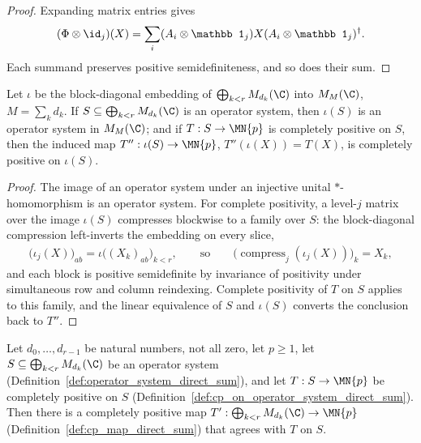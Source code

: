 \begin{proof}\leanok
    Expanding matrix entries gives
    \begin{align}
        (\Phi\otimes\id_j)(X)
        =\sum_i(A_i\otimes\mathbb1_j)X
          (A_i\otimes\mathbb1_j)^\dagger.
    \end{align}
    Each summand preserves positive semidefiniteness, and so does their sum.
\end{proof}

\begin{theorem}
    \label{thm:direct_sum_embedding_transport}
    \leanok
    Let $\iota$ be the block-diagonal embedding of
    $\bigoplus_{k<r}M_{d_k}(\C)$ into $M_M(\C)$, $M=\sum_kd_k$. If
    $S\subseteq\bigoplus_{k<r}M_{d_k}(\C)$ is an operator system, then
    $\iota(S)$ is an operator system in $M_M(\C)$; and if
    $T:S\to\MN{p}$ is completely positive on $S$, then the induced map
    $T'':\iota(S)\to\MN{p}$, $T''(\iota(X))=T(X)$, is completely positive
    on $\iota(S)$.
\end{theorem}

\begin{proof}\leanok
    The image of an operator system under an injective unital
    $*$-homomorphism is an operator system. For complete positivity, a
    level-$j$ matrix over the image $\iota(S)$ compresses blockwise to a
    family over $S$: the block-diagonal compression left-inverts the
    embedding on every slice,
    \begin{align}
        \bigl(\iota_j(X)\bigr)_{ab}
        =\iota\bigl((X_k)_{ab}\bigr)_{k<r},
        \qquad\text{so}\qquad
        \bigl(\operatorname{compress}_j(\iota_j(X))\bigr)_k = X_k ,
    \end{align}
    and each block is positive semidefinite by invariance of positivity
    under simultaneous row and column reindexing. Complete positivity of
    $T$ on $S$ applies to this family, and the linear equivalence of $S$
    and $\iota(S)$ converts the conclusion back to $T''$.
\end{proof}

\begin{theorem}
    \label{thm:extend_cp_operator_system_direct_sum}
    \leanok
    Let $d_0,\dots,d_{r-1}$ be natural numbers, not all zero, let $p\ge1$,
    let $S\subseteq\bigoplus_{k<r}M_{d_k}(\C)$ be an operator system
    (Definition~\ref{def:operator_system_direct_sum}), and let $T:S\to\MN{p}$
    be completely positive on $S$
    (Definition~\ref{def:cp_on_operator_system_direct_sum}). Then there is a
    completely positive map $T':\bigoplus_{k<r}M_{d_k}(\C)\to\MN{p}$
    (Definition~\ref{def:cp_map_direct_sum}) that agrees with $T$ on $S$.
\end{theorem}

